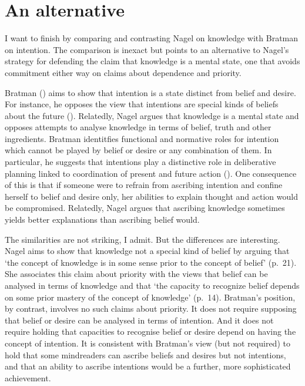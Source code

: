 \documentclass[11pt,a4paper]{extarticle}
\begin{document}
\section{An alternative}
I want to finish by
comparing and contrasting
Nagel on knowledge
with 
Bratman on intention.
The comparison is inexact but points to an alternative to Nagel's strategy for defending the claim that knowledge is a mental state,
one that avoids commitment either way on claims about dependence and priority.


Bratman
(\citeyear{bratman_faces_1999,Bratman:1987xw})
aims to show that intention is a state distinct from  belief and desire.
For instance, he opposes the view that intentions are special kinds of beliefs about the future (\citeyear[pp.\ 257ff]{bratman_faces_1999}).
Relatedly, Nagel argues that knowledge is a mental 
 state and
opposes attempts to analyse knowledge in terms of belief, truth and other ingredients.
Bratman identitfies functional and normative roles for intention which cannot be played by belief or desire or any combination of them.
In particular, he suggests that intentions play a distinctive role in deliberative planning linked to coordination of present and future action
(\citeyear[p.\ 223]{bratman_faces_1999}).
One consequence of this is that if someone were to refrain from ascribing intention and confine herself to belief and desire only, her abilities to explain thought and action would be compromised.
Relatedly, Nagel argues that ascribing knowledge sometimes yields  better explanations than ascribing belief would.

The similarities are not striking, I admit.
But the differences are interesting.
Nagel aims to show that knowledge not a special kind of belief by arguing that `the concept of knowledge is in some sense prior to the concept of belief' (p.\ 21).
She associates this 
claim about priority 
with the views 
that belief can be analysed in terms of knowledge 
and 
that `the capacity to recognize belief depends on some prior mastery of the concept of knowledge' (p.\ 14).
Bratman's position, 
by contrast, 
involves no such claims about priority.
It does not require supposing that belief or desire can be analysed in terms of intention.
And it does not require holding that capacities to recognise belief or desire depend on having the concept of intention.
It is consistent with Bratman's view 
(but not required) 
to hold that 
some mindreaders can ascribe beliefs and desires but not intentions,
and that 
an ability to ascribe intentions would be a further, more sophisticated achievement.
\end{document}

